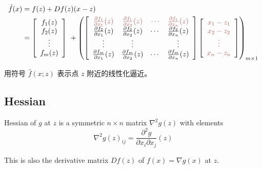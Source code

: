 \begin{definition}
    \begin{equation}\begin{aligned}
        \hat{f} (x) & =f(z)+Df(z)(x-z)\\
         & =\left[\begin{array}{ c }
        f_{1} (z)\\
        f_{2} (z)\\
        \vdots \\
        f_{m} (z)
        \end{array}\right] \ +\left(\left[\begin{array}{ c c c c }
        \textcolor[rgb]{0.72,0.33,0.31}{\frac{\partial f_{1}}{\partial x_{1}} (z)} & \textcolor[rgb]{0.72,0.33,0.31}{\frac{\partial f_{1}}{\partial x_{2}} (z)} & \textcolor[rgb]{0.72,0.33,0.31}{\cdots } & \textcolor[rgb]{0.72,0.33,0.31}{\frac{\partial f_{1}}{\partial x_{n}} (z)}\\
        \frac{\partial f_{2}}{\partial x_{1}} (z) & \frac{\partial f_{2}}{\partial x_{2}} (z) & \cdots  & \frac{\partial f_{2}}{\partial x_{n}} (z)\\
        \vdots  & \vdots  &  & \vdots \\
        \frac{\partial f_{m}}{\partial x_{1}} (z) & \frac{\partial f_{m}}{\partial x_{2}} (z) & \cdots  & \frac{\partial f_{m}}{\partial x_{n}} (z)
        \end{array}\right]\left[\begin{array}{ c }
        \textcolor[rgb]{0.72,0.33,0.31}{x_{1} -z_{1}}\\
        \textcolor[rgb]{0.72,0.33,0.31}{x_{2} -z_{2}}\\
        \textcolor[rgb]{0.72,0.33,0.31}{\vdots }\\
        \textcolor[rgb]{0.72,0.33,0.31}{x_{n} -z_{n}}
        \end{array}\right]\right)_{m\times 1}
        \end{aligned}\end{equation}

    用符号 $ \hat{f}(x ; z) $ 表示点 $ z $ 附近的线性化逼近。
\end{definition}

\subsection{Hessian}

\begin{definition}
    Hessian of $ g $ at $ z $ is a symmetric $ n \times n $ matrix $ \nabla^{2} g(z) $ with elements
\begin{equation}
\nabla^{2} g(z)_{i j}=\frac{\partial^{2} g}{\partial x_{i} \partial x_{j}}(z)
\end{equation}

This is also the derivative matrix $ D f(z) $ of $ f(x)=\nabla g(x) $ at $ z $.
\end{definition}


